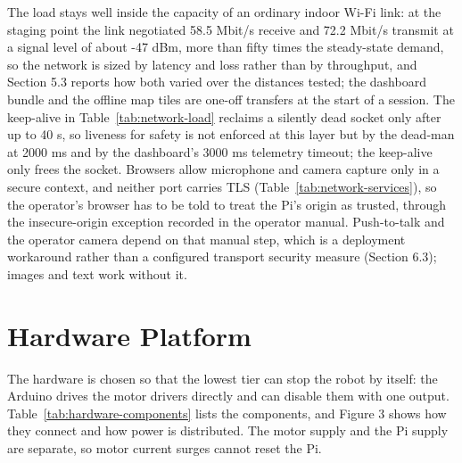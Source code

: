 The load stays well inside the capacity of an ordinary indoor Wi-Fi link: at the staging point the link negotiated 58.5 Mbit/s receive and 72.2 Mbit/s transmit at a signal level of about -47 dBm, more than fifty times the steady-state demand, so the network is sized by latency and loss rather than by throughput, and Section 5.3 reports how both varied over the distances tested; the dashboard bundle and the offline map tiles are one-off transfers at the start of a session. The keep-alive in Table~\ref{tab:network-load} reclaims a silently dead socket only after up to 40 s, so liveness for safety is not enforced at this layer but by the dead-man at 2000 ms and by the dashboard's 3000 ms telemetry timeout; the keep-alive only frees the socket. Browsers allow microphone and camera capture only in a secure context, and neither port carries TLS (Table~\ref{tab:network-services}), so the operator's browser has to be told to treat the Pi's origin as trusted, through the insecure-origin exception recorded in the operator manual. Push-to-talk and the operator camera depend on that manual step, which is a deployment workaround rather than a configured transport security measure (Section 6.3); images and text work without it.

\section{Hardware Platform}

The hardware is chosen so that the lowest tier can stop the robot by itself: the Arduino drives the motor drivers directly and can disable them with one output. Table~\ref{tab:hardware-components} lists the components, and Figure 3 shows how they connect and how power is distributed. The motor supply and the Pi supply are separate, so motor current surges cannot reset the Pi.

